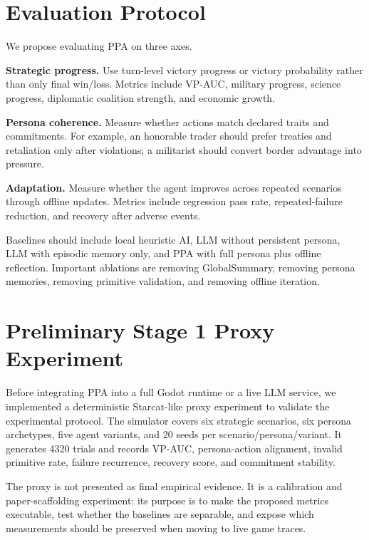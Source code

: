\documentclass[10pt,twocolumn]{article}
\begin{document}
\section{Evaluation Protocol}
We propose evaluating PPA on three axes.

\textbf{Strategic progress.} Use turn-level victory progress or victory probability rather than only final win/loss. Metrics include VP-AUC, military progress, science progress, diplomatic coalition strength, and economic growth.

\textbf{Persona coherence.} Measure whether actions match declared traits and commitments. For example, an honorable trader should prefer treaties and retaliation only after violations; a militarist should convert border advantage into pressure.

\textbf{Adaptation.} Measure whether the agent improves across repeated scenarios through offline updates. Metrics include regression pass rate, repeated-failure reduction, and recovery after adverse events.

Baselines should include local heuristic AI, LLM without persistent persona, LLM with episodic memory only, and PPA with full persona plus offline reflection. Important ablations are removing GlobalSummary, removing persona memories, removing primitive validation, and removing offline iteration.

\section{Preliminary Stage 1 Proxy Experiment}
Before integrating PPA into a full Godot runtime or a live LLM service, we implemented a deterministic Starcat-like proxy experiment to validate the experimental protocol. The simulator covers six strategic scenarios, six persona archetypes, five agent variants, and 20 seeds per scenario/persona/variant. It generates 4320 trials and records VP-AUC, persona-action alignment, invalid primitive rate, failure recurrence, recovery score, and commitment stability.

The proxy is not presented as final empirical evidence. It is a calibration and paper-scaffolding experiment: its purpose is to make the proposed metrics executable, test whether the baselines are separable, and expose which measurements should be preserved when moving to live game traces.
\end{document}
